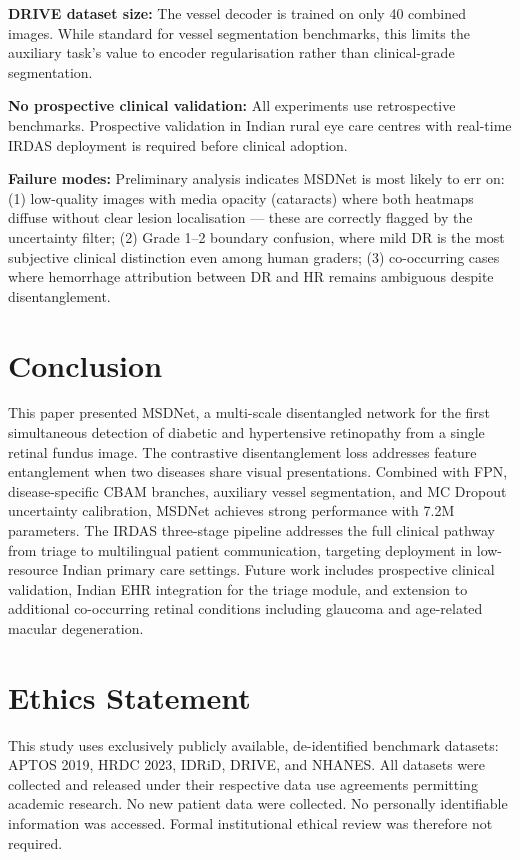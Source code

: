 \documentclass[conference]{IEEEtran}
\begin{document}
\textbf{DRIVE dataset size:} The vessel decoder is trained on only 40 combined images. While standard for vessel segmentation benchmarks, this limits the auxiliary task's value to encoder regularisation rather than clinical-grade segmentation.

\textbf{No prospective clinical validation:} All experiments use retrospective benchmarks. Prospective validation in Indian rural eye care centres with real-time IRDAS deployment is required before clinical adoption.

\textbf{Failure modes:} Preliminary analysis indicates MSDNet is most likely to err on: (1) low-quality images with media opacity (cataracts) where both heatmaps diffuse without clear lesion localisation --- these are correctly flagged by the uncertainty filter; (2) Grade 1--2 boundary confusion, where mild DR is the most subjective clinical distinction even among human graders; (3) co-occurring cases where hemorrhage attribution between DR and HR remains ambiguous despite disentanglement.

\section{Conclusion}

This paper presented MSDNet, a multi-scale disentangled network for the first simultaneous detection of diabetic and hypertensive retinopathy from a single retinal fundus image. The contrastive disentanglement loss addresses feature entanglement when two diseases share visual presentations. Combined with FPN, disease-specific CBAM branches, auxiliary vessel segmentation, and MC Dropout uncertainty calibration, MSDNet achieves strong performance with 7.2M parameters. The IRDAS three-stage pipeline addresses the full clinical pathway from triage to multilingual patient communication, targeting deployment in low-resource Indian primary care settings. Future work includes prospective clinical validation, Indian EHR integration for the triage module, and extension to additional co-occurring retinal conditions including glaucoma and age-related macular degeneration.

\section*{Ethics Statement}

This study uses exclusively publicly available, de-identified benchmark datasets: APTOS 2019, HRDC 2023, IDRiD, DRIVE, and NHANES. All datasets were collected and released under their respective data use agreements permitting academic research. No new patient data were collected. No personally identifiable information was accessed. Formal institutional ethical review was therefore not required.
\end{document}
